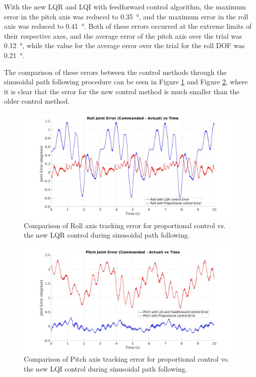 With the new LQR and LQI with feedforward control algorithm, the maximum error in the pitch axis was reduced to \SI{0.35}{\degree}, and the maximum error in the roll axis was reduced to \SI{0.41}{\degree}. Both of these errors occurred at the extreme limits of their respective axes, and the average error of the pitch axis over the trial was \SI{0.12}{\degree}, while the value for the average error over the trial for the roll DOF was \SI{0.21}{\degree}.

The comparison of these errors between the control methods through the sinusoidal path following procedure can be seen in Figure \ref{fig:roll_sin_error} and Figure \ref{fig:pitch_sin_error}, where it is clear that the error for the new control method is much smaller than the older control method.

\begin{figure}[H]
    \centering
    \includegraphics[width=1.00\linewidth]{figures/roll_sin_error.jpg}
    \caption{Comparison of Roll axis tracking error for proportional control vs. the new LQR control during sinusoidal path following.}
    \label{fig:roll_sin_error}
\end{figure}

\begin{figure}[H]
    \centering
    \includegraphics[width=1.00\linewidth]{figures/pitch_sin_error.jpg}
    \caption{Comparison of Pitch axis tracking error for proportional control vs. the new LQI control during sinusoidal path following.}
    \label{fig:pitch_sin_error}
\end{figure}

